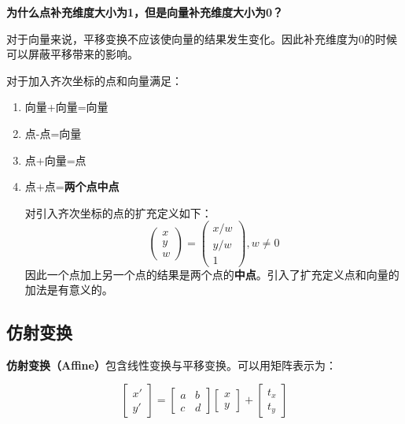 \documentclass[openany]{progbookcn}
\begin{document}
\begin{question}
	\textbf{为什么点补充维度大小为1，但是向量补充维度大小为0？}
	
	对于向量来说，平移变换不应该使向量的结果发生变化。因此补充维度为0的时候可以屏蔽平移带来的影响。
	
	对于加入齐次坐标的点和向量满足：
	\begin{enumerate}
		\item 向量+向量=向量
		\item 点-点=向量
		\item 点+向量=点
		\item 点+点=\textbf{两个点中点}
		
			对引入齐次坐标的点的扩充定义如下：
			\begin{equation}
				\begin{pmatrix}x\\y\\w\end{pmatrix}=\begin{pmatrix}x/w\\y/w\\1\end{pmatrix},w\ne 0
			\end{equation}
			因此一个点加上另一个点的结果是两个点的\textbf{中点}。引入了扩充定义点和向量的加法是有意义的。
	\end{enumerate}
\end{question}

\subsection{仿射变换}

\textbf{仿射变换（Affine）}包含线性变换与平移变换。可以用矩阵表示为：

\begin{equation}
	\begin{bmatrix}x'\\y'\end{bmatrix}=\begin{bmatrix}a&b\\c&d\end{bmatrix}\begin{bmatrix}x\\y\end{bmatrix}+\begin{bmatrix}t_x\\t_y\end{bmatrix}
\end{equation}
\end{document}
